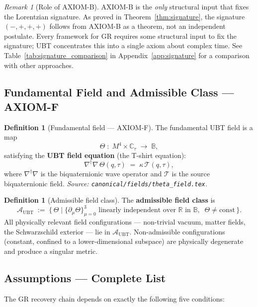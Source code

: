 \documentclass[12pt,a4paper]{article}
\theoremstyle{definition}
\newtheorem{definition}[theorem]{Definition}
\theoremstyle{remark}
\newtheorem{remark}[theorem]{Remark}
\newcommand{\B}{\mathbb{B}}
\newcommand{\R}{\mathbb{R}}
\newcommand{\C}{\mathbb{C}}
\newcommand{\Aubt}{\mathcal{A}_{\mathrm{UBT}}}
\begin{document}
\begin{remark}[Role of AXIOM-B]
AXIOM-B is the \emph{only} structural input that fixes the Lorentzian signature.
As proved in Theorem~\ref{thm:signature}, the signature $(-,+,+,+)$ follows from
AXIOM-B as a theorem, not an independent postulate.  Every framework for GR
requires some structural input to fix the signature; UBT concentrates this into a
single axiom about complex time.  See Table~\ref{tab:signature_comparison} in
Appendix~\ref{app:signature} for a comparison with other approaches.
\end{remark}

\subsection{Fundamental Field and Admissible Class — AXIOM-F}
\label{sec:thetafield}

\begin{definition}[Fundamental field — AXIOM-F]
\label{def:thetafield}
The fundamental UBT field is a map
\[
  \Theta \;:\; M^4 \times \C_\tau \;\longrightarrow\; \B,
\]
satisfying the \textbf{UBT field equation} (the T-shirt equation):
\[
  \nabla^\dagger\nabla\,\Theta(q,\tau) \;=\; \kappa\,\mathcal{T}(q,\tau),
\]
where $\nabla^\dagger\nabla$ is the biquaternionic wave operator and
$\mathcal{T}$ is the source biquaternionic field.
\textit{Source: \texttt{canonical/fields/theta\_field.tex}.}
\end{definition}

\begin{definition}[Admissible field class]
\label{def:admissible}
The \textbf{admissible field class} is
\[
  \Aubt \;:=\; \bigl\{\,\Theta \;\big|\; \{\partial_\mu\Theta\}_{\mu=0}^3
  \text{ linearly independent over } \R \text{ in } \B,\;\; \Theta\neq\mathrm{const}
  \,\bigr\}.
\]
All physically relevant field configurations --- non-trivial vacuum, matter fields,
the Schwarzschild exterior --- lie in $\Aubt$.  Non-admissible configurations
(constant, confined to a lower-dimensional subspace) are physically degenerate and
produce a singular metric.
\end{definition}

\subsection{Assumptions — Complete List}
\label{sec:assumptions}

The GR recovery chain depends on exactly the following five conditions:
\end{document}
